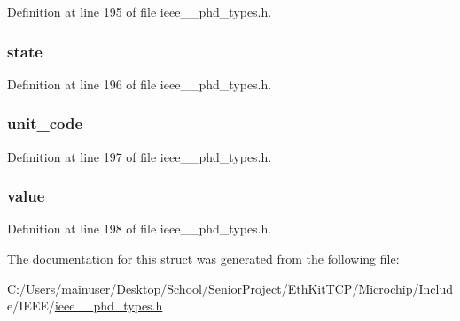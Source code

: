 Definition at line 195 of file ieee\+\_\+\_\+phd\+\_\+types.\+h.

\hypertarget{struct___nu_obs_value_a13d01c3f9f21fd12a22772c0e1b7d88b}{}
\subsubsection[{state}]{ state}\label{struct___nu_obs_value_a13d01c3f9f21fd12a22772c0e1b7d88b}


Definition at line 196 of file ieee\+\_\+\_\+phd\+\_\+types.\+h.

\hypertarget{struct___nu_obs_value_a1bc4b9eecd5c78485b24d8fb14c91398}{}
\subsubsection[{unit\+\_\+code}]{ unit\+\_\+code}\label{struct___nu_obs_value_a1bc4b9eecd5c78485b24d8fb14c91398}


Definition at line 197 of file ieee\+\_\+\_\+phd\+\_\+types.\+h.

\hypertarget{struct___nu_obs_value_ac7ab47e6d1990917b05d22ecaddb0a00}{}
\subsubsection[{value}]{ value}\label{struct___nu_obs_value_ac7ab47e6d1990917b05d22ecaddb0a00}


Definition at line 198 of file ieee\+\_\+\_\+phd\+\_\+types.\+h.



The documentation for this struct was generated from the following file\+:\begin{DoxyCompactItemize}
\item 
C\+:/\+Users/mainuser/\+Desktop/\+School/\+Senior\+Project/\+Eth\+Kit\+T\+C\+P/\+Microchip/\+Include/\+I\+E\+E\+E/\hyperlink{ieee__11073__phd__types_8h}{ieee\+\_\+\_\+phd\+\_\+types.\+h}\end{DoxyCompactItemize}
